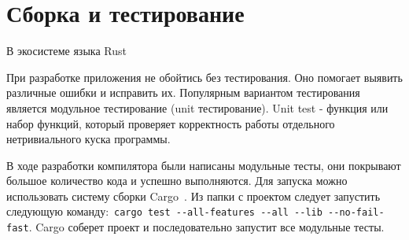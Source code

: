 \chapter{Сборка и тестирование}
\label{ch:chap4_soft_testing}

В экосистеме языка Rust

При разработке приложения не обойтись без тестирования.
Оно помогает выявить различные ошибки и исправить их.
Популярным вариантом тестирования является модульное тестирование (unit тестирование).
Unit test - функция или набор функций, который проверяет корректность работы отдельного нетривиального куска программы.

В ходе разработки компилятора были написаны модульные тесты, они покрывают большое количество кода и успешно выполняются.
Для запуска можно использовать систему сборки Cargo~\cite{CargoBook}.
Из папки с проектом следует запустить следующую команду:~\lstinline{cargo test --all-features --all --lib --no-fail-fast}.
Cargo соберет проект и последовательно запустит все модульные тесты.



